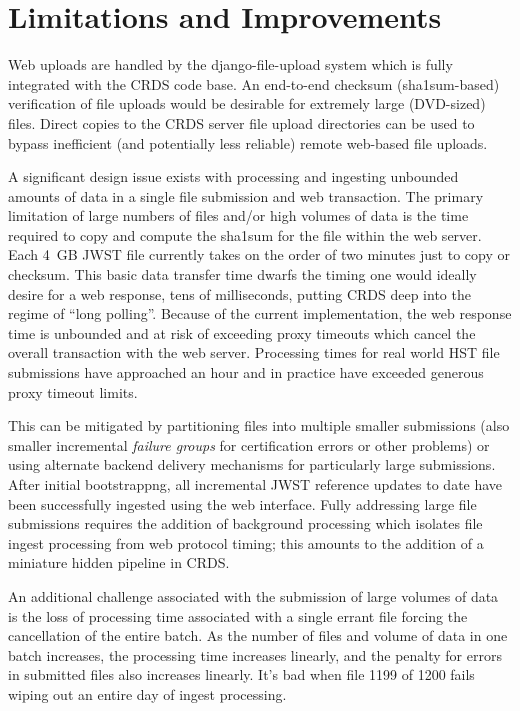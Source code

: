 \documentclass[final,authoryear,5p,times,twocolumn]{elsarticle}
\begin{document}
\section{Limitations and Improvements}

Web uploads are handled by the django-file-upload
system which is fully integrated with the CRDS code base.  An end-to-end
checksum (sha1sum-based) verification of file uploads would be desirable
for extremely large
(DVD-sized) files.  Direct copies to the CRDS server file upload directories
can be used to bypass inefficient (and potentially less reliable) remote
web-based file uploads.

A significant design issue exists with processing and ingesting unbounded
amounts of data in a single file submission and web transaction.  
The primary limitation of large numbers of files and/or high volumes
of data is the time required to copy and compute 
the sha1sum for the file within
the web server.  Each 4~GB JWST file currently takes on the order of 
two minutes just to copy or checksum.   This basic data transfer
time dwarfs the timing one would ideally desire for a web response,  
tens of milliseconds, putting CRDS deep into the regime of ``long polling''.    
Because of the current implementation, the web response time is
unbounded and at risk of exceeding proxy timeouts which cancel 
the overall transaction with the web server.   Processing times for 
real world HST file submissions have approached an hour and
in practice have exceeded generous proxy timeout limits.

This can be
mitigated by partitioning files into multiple smaller submissions (also smaller
incremental \textit{failure groups} for certification errors or other problems) or
using alternate backend delivery mechanisms for particularly large submissions.
After initial bootstrappng, all incremental JWST reference updates to date have
been successfully ingested using the web interface.  Fully addressing large
file submissions requires the addition of background processing which isolates
file ingest processing from web protocol timing; this amounts to the addition
of a miniature hidden pipeline in CRDS.  

An additional challenge associated
with the submission of large volumes of data is the loss of processing time
associated with a single errant file forcing the cancellation of the entire
batch.  As the number of files and volume of data in one batch increases, the
processing time increases linearly, and the penalty for errors in submitted
files also increases linearly.  It's bad when file 1199 of 1200 fails wiping
out an entire day of ingest processing.  
\end{document}
